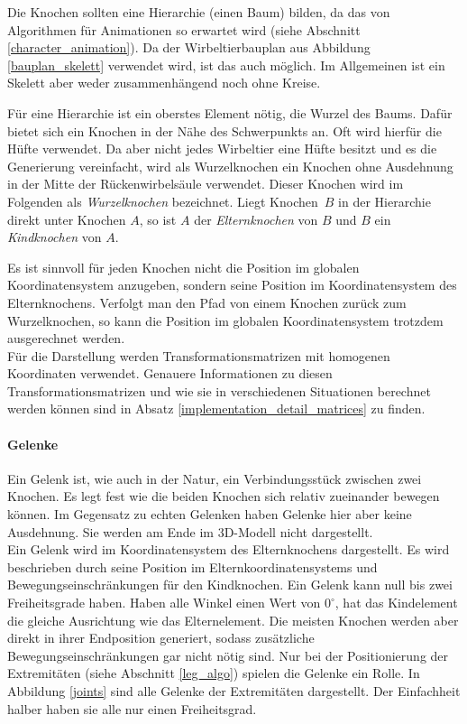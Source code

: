 Die Knochen sollten eine Hierarchie (einen Baum) bilden, da das von Algorithmen für Animationen so erwartet wird (siehe Abschnitt \ref{character_animation}). Da der Wirbeltierbauplan aus Abbildung \ref{bauplan_skelett} verwendet wird, ist das auch möglich. Im Allgemeinen ist ein Skelett aber weder zusammenhängend noch ohne Kreise.

Für eine Hierarchie ist ein oberstes Element nötig, die Wurzel des Baums.
Dafür bietet sich ein Knochen in der Nähe des Schwerpunkts an. Oft wird hierfür die Hüfte verwendet.
Da aber nicht jedes Wirbeltier eine Hüfte besitzt und es die Generierung vereinfacht, wird als Wurzelknochen ein Knochen ohne Ausdehnung in der Mitte der Rückenwirbelsäule verwendet. Dieser Knochen wird im Folgenden als \emph{Wurzelknochen} bezeichnet. Liegt \mbox{Knochen $B$} in der Hierarchie direkt unter Knochen $A$, so ist $A$ der \emph{Elternknochen} von $B$ und $B$ ein \emph{Kindknochen} von $A$.

Es ist sinnvoll für jeden Knochen nicht die Position im globalen Koordinatensystem anzugeben, sondern seine Position im Koordinatensystem des Elternknochens. Verfolgt man den Pfad von einem Knochen zurück zum Wurzelknochen, so kann die Position im globalen Koordinatensystem trotzdem ausgerechnet werden. \\
Für die Darstellung werden Transformationsmatrizen mit homogenen Koordinaten verwendet. Genauere Informationen zu diesen Transformationsmatrizen und wie sie in verschiedenen Situationen berechnet werden können sind in Absatz \ref{implementation_detail_matrices} zu finden.

\paragraph{Gelenke}
Ein Gelenk ist, wie auch in der Natur, ein Verbindungsstück zwischen zwei Knochen. Es legt fest wie die beiden Knochen sich relativ zueinander bewegen können. Im Gegensatz zu echten Gelenken haben Gelenke hier aber keine Ausdehnung. Sie werden am Ende im 3D-Modell nicht dargestellt.\\
Ein Gelenk wird im Koordinatensystem des Elternknochens dargestellt. Es wird beschrieben durch seine Position im Elternkoordinatensystems und Bewegungseinschränkungen für den Kindknochen. Ein Gelenk kann null bis zwei Freiheitsgrade haben. Haben alle Winkel einen Wert von $0^\circ$, hat das Kindelement die gleiche Ausrichtung wie das Elternelement. 
Die meisten Knochen werden aber direkt in ihrer Endposition generiert, sodass zusätzliche Bewegungseinschränkungen gar nicht nötig sind. Nur bei der Positionierung der Extremitäten (siehe Abschnitt \ref{leg_algo}) spielen die Gelenke ein Rolle.
In Abbildung \ref{joints} sind alle Gelenke der Extremitäten dargestellt. Der Einfachheit halber haben sie alle nur einen Freiheitsgrad.


